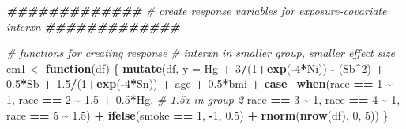 \documentclass[12pt, twoside]{amherstthesis}
\newenvironment{Shaded}{\begin{snugshade}}{\end{snugshade}}
\newcommand{\AttributeTok}[1]{\textcolor[rgb]{0.13,0.29,0.53}{#1}}
\newcommand{\CommentTok}[1]{\textcolor[rgb]{0.56,0.35,0.01}{\textit{#1}}}
\newcommand{\ControlFlowTok}[1]{\textcolor[rgb]{0.13,0.29,0.53}{\textbf{#1}}}
\newcommand{\DecValTok}[1]{\textcolor[rgb]{0.00,0.00,0.81}{#1}}
\newcommand{\DocumentationTok}[1]{\textcolor[rgb]{0.56,0.35,0.01}{\textbf{\textit{#1}}}}
\newcommand{\FloatTok}[1]{\textcolor[rgb]{0.00,0.00,0.81}{#1}}
\newcommand{\FunctionTok}[1]{\textcolor[rgb]{0.13,0.29,0.53}{\textbf{#1}}}
\newcommand{\NormalTok}[1]{#1}
\newcommand{\OtherTok}[1]{\textcolor[rgb]{0.56,0.35,0.01}{#1}}
\newcommand{\SpecialCharTok}[1]{\textcolor[rgb]{0.81,0.36,0.00}{\textbf{#1}}}
\begin{document}
\scriptsize
\begin{Shaded}
\begin{Highlighting}[]
\DocumentationTok{\#\#\#\#\#\#\#\#\#\#\#\#\#}
\CommentTok{\# create response variables for exposure{-}covariate interxn}
\DocumentationTok{\#\#\#\#\#\#\#\#\#\#\#\#\#}

\CommentTok{\# functions for creating response}
\CommentTok{\# interxn in smaller group, smaller effect size}
\NormalTok{em1 }\OtherTok{\textless{}{-}} \ControlFlowTok{function}\NormalTok{(df) \{}
  \FunctionTok{mutate}\NormalTok{(df, }\AttributeTok{y =} 
\NormalTok{           Hg }\SpecialCharTok{+} \DecValTok{3}\SpecialCharTok{/}\NormalTok{(}\DecValTok{1}\SpecialCharTok{+}\FunctionTok{exp}\NormalTok{(}\SpecialCharTok{{-}}\DecValTok{4}\SpecialCharTok{*}\NormalTok{Ni)) }\SpecialCharTok{{-}}\NormalTok{ (Sb}\SpecialCharTok{\^{}}\DecValTok{2}\NormalTok{) }\SpecialCharTok{+} \FloatTok{0.5}\SpecialCharTok{*}\NormalTok{Sb }\SpecialCharTok{+} \FloatTok{1.5}\SpecialCharTok{/}\NormalTok{(}\DecValTok{1}\SpecialCharTok{+}\FunctionTok{exp}\NormalTok{(}\SpecialCharTok{{-}}\DecValTok{4}\SpecialCharTok{*}\NormalTok{Sn)) }\SpecialCharTok{+} 
\NormalTok{           age }\SpecialCharTok{+} \FloatTok{0.5}\SpecialCharTok{*}\NormalTok{bmi }\SpecialCharTok{+} 
           \FunctionTok{case\_when}\NormalTok{(race }\SpecialCharTok{==} \DecValTok{1} \SpecialCharTok{\textasciitilde{}} \DecValTok{1}\NormalTok{, }
\NormalTok{                     race }\SpecialCharTok{==} \DecValTok{2} \SpecialCharTok{\textasciitilde{}} \FloatTok{1.5} \SpecialCharTok{+} \FloatTok{0.5}\SpecialCharTok{*}\NormalTok{Hg, }\CommentTok{\# 1.5x in group 2}
\NormalTok{                     race }\SpecialCharTok{==} \DecValTok{3} \SpecialCharTok{\textasciitilde{}} \DecValTok{1}\NormalTok{, }
\NormalTok{                     race }\SpecialCharTok{==} \DecValTok{4} \SpecialCharTok{\textasciitilde{}} \DecValTok{1}\NormalTok{, }
\NormalTok{                     race }\SpecialCharTok{==} \DecValTok{5} \SpecialCharTok{\textasciitilde{}} \FloatTok{1.5}\NormalTok{) }\SpecialCharTok{+}
           \FunctionTok{ifelse}\NormalTok{(smoke }\SpecialCharTok{==} \DecValTok{1}\NormalTok{, }\SpecialCharTok{{-}}\DecValTok{1}\NormalTok{, }\FloatTok{0.5}\NormalTok{) }\SpecialCharTok{+}
           \FunctionTok{rnorm}\NormalTok{(}\FunctionTok{nrow}\NormalTok{(df), }\DecValTok{0}\NormalTok{, }\DecValTok{5}\NormalTok{))}
\NormalTok{\}}


\end{Highlighting}
\end{Shaded}
\end{document}
